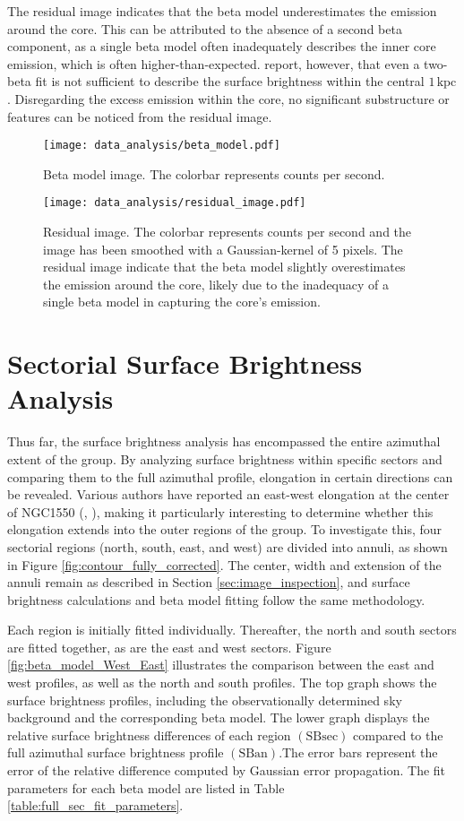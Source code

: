 The residual image indicates that the beta model underestimates the emission around the core. This can be attributed to the absence of a second beta component, as a single beta model often inadequately describes the inner core emission, which is often higher-than-expected. \cite{Sun_2003} report, however, that even a two-beta fit is not sufficient to describe the surface brightness within the central \(1\,\text{kpc}\). Disregarding the excess emission within the core, no significant substructure or features can be noticed from the residual image.
\begin{figure}[htbp]
    \centering
    \texttt{[image: data\_analysis/beta\_model.pdf]}
    \caption{Beta model image. The colorbar represents counts per second.}
    \label{fig:beta_model}
\end{figure}
\begin{figure}[htbp]
    \centering
    \texttt{[image: data\_analysis/residual\_image.pdf]}
    \caption{Residual image. The colorbar represents counts per second and the image has been smoothed with a Gaussian-kernel of 5 pixels. The residual image indicate that the beta model slightly overestimates the emission around the core, likely due to the inadequacy of a single beta model in capturing the core's emission.}
    \label{fig:residual_image}
\end{figure}
\section{Sectorial Surface Brightness Analysis}
Thus far, the surface brightness analysis has encompassed the entire azimuthal extent of the group. By analyzing surface brightness within specific sectors and comparing them to the full azimuthal profile, elongation in certain directions can be revealed. Various authors have reported an east-west elongation at the center of NGC1550 (\cite{Sun_2003}, \cite{Kolokythas_2020}), making it particularly interesting to determine whether this elongation extends into the outer regions of the group. To investigate this, four sectorial regions (north, south, east, and west) are divided into annuli, as shown in Figure \ref{fig:contour_fully_corrected}. The center, width and extension of the annuli remain as described in Section \ref{sec:image_inspection}, and surface brightness calculations and beta model fitting follow the same methodology.

Each region is initially fitted individually. Thereafter, the north and south sectors are fitted together, as are the east and west sectors. Figure \ref{fig:beta_model_West_East} illustrates the comparison between the east and west profiles, as well as the north and south profiles. The top graph shows the surface brightness profiles, including the observationally determined sky background and the corresponding beta model. The lower graph displays the relative surface brightness differences of each region \((\text{SB}\text{sec})\) compared to the full azimuthal surface brightness profile \((\text{SB}\text{an})\).The error bars represent the error of the relative difference computed by Gaussian error propagation. The fit parameters for each beta model are listed in Table \ref{table:full_sec_fit_parameters}. 

